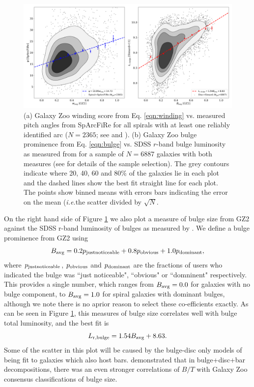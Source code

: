 \documentclass[usenatbib]{mn2e}
\newcommand{\ie}{{\it i.e.}}
\newcommand{\be}{\begin{equation}}
\newcommand{\ee}{\end{equation}}
\begin{document}
\begin{figure}
\includegraphics[width=140mm]{rossfigure.png}
\caption{(a) Galaxy Zoo winding score from Eq. \ref{eqn:winding} vs. measured pitch angles from SpArcFiRe for all spirals with at least one reliably identified arc ($N=2365$; see \citealt{DavisHayes2014} and \citealt{Hart2017}). (b) Galaxy Zoo bulge prominence from Eq. \ref{eqn:bulge} vs. SDSS $r$-band bulge luminosity as measured from \citet{Simard2011} for a sample of $N=6887$ galaxies with both measures (see  \citealt{Hart2017} for details of the sample selection). The grey contours indicate where 20, 40, 60 and 80\% of the galaxies lie in each plot and the dashed lines show the best fit straight line for each plot. The points show binned means with errors bars indicating the error on the mean (\ie the scatter divided by $\sqrt{N}$.  \label{pitch}}
\end{figure}

On the right hand side of Figure \ref{pitch} we also plot a measure of bulge size from GZ2 against the SDSS r-band luminosity of bulges as measured by \citet{Simard2011}.  We define a bulge prominence from GZ2 using
\be
\label{eqn:bulge}
B_{\rm avg} = 0.2p_{\rm  just noticeable} + 0.8p_{\rm obvious}+ 1.0p_{\rm dominant},
\ee
where $p_{\rm  just noticeable}$, $p_{\rm obvious}$ and $p_{\rm dominant}$ are the fractions of users who indicated the bulge was ``just noticeable", ``obvious" or ``domninent" respectively. This provides a single number, which ranges from $B_{\rm avg} = 0.0$ for galaxies with no bulge component, to $B_{\rm avg} = 1.0$ for spiral galaxies with dominant bulges, although we note there is no aprior reason to select these co-efficients exactly. As can be seen in Figure \ref{pitch}, this measures of bulge size correlates well with bulge total luminosity, and the best fit is 
\be 
L_{\rm r,bulge} = 1.54 B_{\rm avg}  + 8.63.
\ee
Some of the scatter in this plot will be caused by the bulge-disc only models of \citet{Simard2011} being fit to galaxies which also host bars. \citet{Kruk2018} demonstrated that in bulge+disc+bar decompositions, there was an even stronger correlations of $B/T$ with Galaxy Zoo consensus classifications of bulge size. 
 
\end{document}
